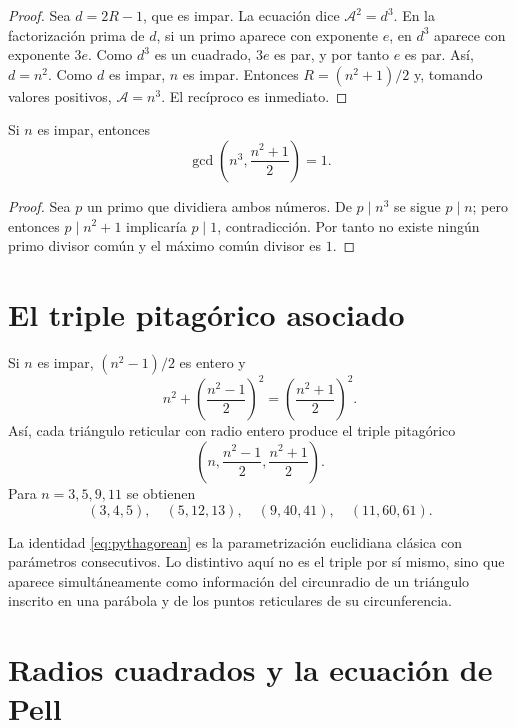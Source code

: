 \documentclass[11pt,a4paper,openany]{report}
\newcommand{\Area}{\mathcal{A}}
\begin{document}
\begin{proof}
Sea \(d=2R-1\), que es impar. La ecuación dice \(\Area^2=d^3\). En la factorización prima de \(d\), si un primo aparece con exponente \(e\), en \(d^3\) aparece con exponente \(3e\). Como \(d^3\) es un cuadrado, \(3e\) es par, y por tanto \(e\) es par. Así, \(d=n^2\). Como \(d\) es impar, \(n\) es impar. Entonces \(R=(n^2+1)/2\) y, tomando valores positivos, \(\Area=n^3\). El recíproco es inmediato.
\end{proof}

\begin{corollary}
Si \(n\) es impar, entonces
\[
 \gcd\left(n^3,\frac{n^2+1}{2}\right)=1.
\]
\end{corollary}

\begin{proof}
Sea \(p\) un primo que dividiera ambos números. De \(p\mid n^3\) se sigue \(p\mid n\); pero entonces \(p\mid n^2+1\) implicaría \(p\mid1\), contradicción. Por tanto no existe ningún primo divisor común y el máximo común divisor es \(1\).
\end{proof}

\section{El triple pitagórico asociado}

Si \(n\) es impar, \((n^2-1)/2\) es entero y
\begin{equation}
 n^2+\left(\frac{n^2-1}{2}\right)^2
 =\left(\frac{n^2+1}{2}\right)^2.
 \label{eq:pythagorean}
\end{equation}
Así, cada triángulo reticular con radio entero produce el triple pitagórico
\[
 \boxed{\left(n,\frac{n^2-1}{2},\frac{n^2+1}{2}\right).}
\]
Para \(n=3,5,9,11\) se obtienen
\[
 (3,4,5),\quad(5,12,13),\quad(9,40,41),\quad(11,60,61).
\]

\begin{classicalbox}
La identidad \eqref{eq:pythagorean} es la parametrización euclidiana clásica con parámetros consecutivos. Lo distintivo aquí no es el triple por sí mismo, sino que aparece simultáneamente como información del circunradio de un triángulo inscrito en una parábola y de los puntos reticulares de su circunferencia.
\end{classicalbox}

\section{Radios cuadrados y la ecuación de Pell}
\end{document}
